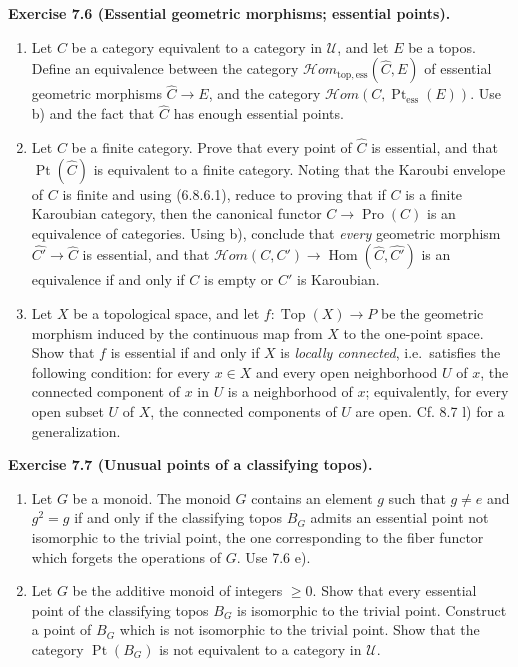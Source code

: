 \documentclass[11pt]{article}
\newcommand{\U}{\mathcal{U}}
\newcommand{\Top}{\operatorname{Top}}
\newcommand{\Hom}{\operatorname{Hom}}
\newcommand{\Ppoint}{\operatorname{Pt}}
\newcommand{\Hhom}{\mathcal{H}om}
\newcommand{\ie}{i.e.}
\newenvironment{remarktext}[1]{\par\medskip\noindent\textbf{#1.}\ }{\par\medskip}
\providecommand{\Pro}{\operatorname{Pro}}
\providecommand{\Ppointess}{\operatorname{Pt}_{\mathrm{ess}}}
\providecommand{\Hhomtopess}{\mathcal{H}om_{\mathrm{top},\mathrm{ess}}}
\begin{document}
\begin{remarktext}{Exercise 7.6 (Essential geometric morphisms; essential points)}
\begin{enumerate}[label=\alph*)]
\item Let \(C\) be a category equivalent to a category in \(\U\), and let \(E\) be a topos. Define an equivalence between the category \(\Hhomtopess(\widehat C,E)\) of essential geometric morphisms \(\widehat C\to E\), and the category \(\Hhom(C,\Ppointess(E))\). Use b) and the fact that \(\widehat C\) has enough essential points.

\item Let \(C\) be a finite category. Prove that every point of \(\widehat C\) is essential, and that \(\Ppoint(\widehat C)\) is equivalent to a finite category. Noting that the Karoubi envelope of \(C\) is finite and using (6.8.6.1), reduce to proving that if \(C\) is a finite Karoubian category, then the canonical functor \(C\to\Pro(C)\) is an equivalence of categories. Using b), conclude that \emph{every} geometric morphism \(\widehat{C'}\to\widehat C\) is essential, and that \(\Hhom(C,C')\to\Hom(\widehat C,\widehat{C'})\) is an equivalence if and only if \(C\) is empty or \(C'\) is Karoubian.

\item Let \(X\) be a topological space, and let \(f:\Top(X)\to P\) be the geometric morphism induced by the continuous map from \(X\) to the one-point space. Show that \(f\) is essential if and only if \(X\) is \emph{locally connected}, \ie\ satisfies the following condition: for every \(x\in X\) and every open neighborhood \(U\) of \(x\), the connected component of \(x\) in \(U\) is a neighborhood of \(x\); equivalently, for every open subset \(U\) of \(X\), the connected components of \(U\) are open. Cf. 8.7 l) for a generalization.
\end{enumerate}
\end{remarktext}

\begin{remarktext}{Exercise 7.7 (Unusual points of a classifying topos)}
\begin{enumerate}[label=\alph*)]
\item Let \(G\) be a monoid. The monoid \(G\) contains an element \(g\) such that \(g\ne e\) and \(g^2=g\) if and only if the classifying topos \(B_G\) admits an essential point not isomorphic to the trivial point, the one corresponding to the fiber functor which forgets the operations of \(G\). Use 7.6 e).
\item Let \(G\) be the additive monoid of integers \(\ge0\). Show that every essential point of the classifying topos \(B_G\) is isomorphic to the trivial point. Construct a point of \(B_G\) which is not isomorphic to the trivial point. Show that the category \(\Ppoint(B_G)\) is not equivalent to a category in \(\U\).
\end{enumerate}
\end{remarktext}
\end{document}
